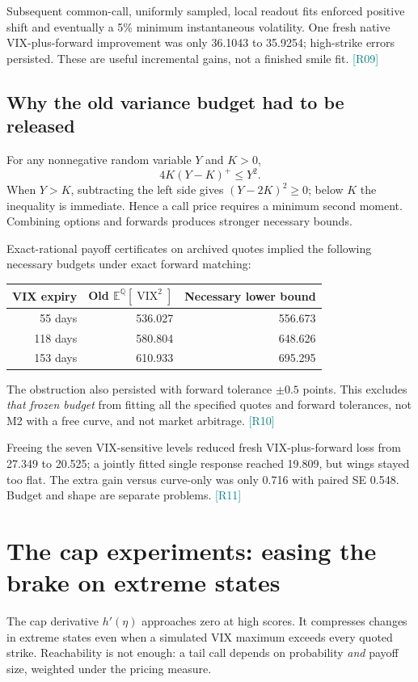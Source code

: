 \documentclass[11pt,a4paper]{article}
\newcommand{\E}{\mathbb E^{\mathbb Q}}
\newcommand{\VIX}{\operatorname{VIX}}
\newcommand{\src}[1]{\textcolor{teal}{\small[#1]}}
\begin{document}
Subsequent common-call, uniformly sampled, local readout fits enforced positive shift and eventually a 5\% minimum instantaneous volatility. One fresh native VIX-plus-forward improvement was only 36.1043 to 35.9254; high-strike errors persisted. These are useful incremental gains, not a finished smile fit. \src{R09}

\subsection{Why the old variance budget had to be released}
For any nonnegative random variable $Y$ and $K>0$,
\begin{equation}
4K(Y-K)^+\leq Y^2.
\end{equation}
When $Y>K$, subtracting the left side gives $(Y-2K)^2\geq0$; below $K$ the inequality is immediate. Hence a call price requires a minimum second moment. Combining options and forwards produces stronger necessary bounds.

Exact-rational payoff certificates on archived quotes implied the following necessary budgets under exact forward matching:
\begin{center}
\begin{tabular}{rrr}\toprule
VIX expiry & Old $\E[\VIX^2]$ & Necessary lower bound\\\midrule
55 days & 536.027 & 556.673\\
118 days & 580.804 & 648.626\\
153 days & 610.933 & 695.295\\\bottomrule
\end{tabular}
\end{center}
The obstruction also persisted with forward tolerance $\pm0.5$ points. This excludes \emph{that frozen budget} from fitting all the specified quotes and forward tolerances, not M2 with a free curve, and not market arbitrage. \src{R10}

Freeing the seven VIX-sensitive levels reduced fresh VIX-plus-forward loss from 27.349 to 20.525; a jointly fitted single response reached 19.809, but wings stayed too flat. The extra gain versus curve-only was only 0.716 with paired SE 0.548. Budget and shape are separate problems. \src{R11}

\section{The cap experiments: easing the brake on extreme states}
The cap derivative $h'(\eta)$ approaches zero at high scores. It compresses changes in extreme states even when a simulated VIX maximum exceeds every quoted strike. Reachability is not enough: a tail call depends on probability \emph{and} payoff size, weighted under the pricing measure.
\end{document}
